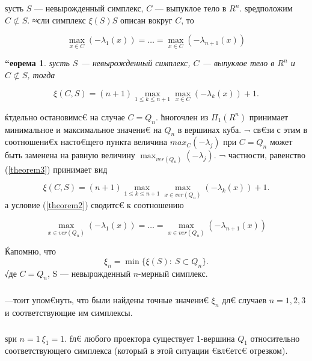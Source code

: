 \documentclass[12pt]{article} %
\begin{document}
	\newtheorem{Th2}{—ледствие}
	\begin{Th}ѕусть $S$ --- невырожденный симплекс, $C$ --- выпуклое тело в $R^n$. ѕредположим $C \not \subset S$. ≈сли симплекс $\xi(S)S$ описан вокруг $C$, то
		
		\begin{equation}\label{theorem2}
		    \max_{x \in C} (-\lambda_1(x))=\dots=\max_{x \in C} (-\lambda_{n+1}(x))
		\end{equation}
	\end{Th}
	
	\newtheorem{Th3}[Th]{“еорема}
	\begin{Th3}ѕусть $S$ --- невырожденный симплекс, $C$ --- выпуклое тело в $R^n$ и $C \not \subset S$, тогда 
		
		\begin{equation}\label{theorem3}
		\xi(C, S) = (n+1) \max_{1\leqslant k \leqslant n+1} \max_{x \in C} (-\lambda_k(x)) + 1.
		\end{equation}
	\end{Th3}
	
	ќтдельно остановимс€ на случае $C = Q_n$. ћногочлен из $\Pi_1(R^n)$ принимает минимальное и максимальное значени€ на $Q_n$ в вершинах куба. ¬ св€зи с этим в соотношени€х насто€щего пункта величина $max_C(-\lambda_j)$ при $C=Q_n$ может быть заменена на равную величину $\max_{ver(Q_n)}(-\lambda_j)$. ¬ частности, равенство (\ref{theorem3}) принимает вид
	
    \begin{equation}\label{ksiVer}
		\xi(C, S) = (n+1) \max_{1\leqslant k \leqslant n+1} \max_{x \in ver(Q_n)} (-\lambda_k(x)) + 1.
	\end{equation}
	а условие (\ref{theorem2}) сводитс€ к соотношению
	
	\begin{equation}\label{f10}
	    \max_{x \in ver(Q_n)} (-\lambda_1(x))=\dots=\max_{x \in ver(Q_n)} (-\lambda_{n+1}(x))
	\end{equation}

    Ќапомню, что
    $$\xi_n = \min \{\xi(S):\ S \subset Q_n\}.$$
	√де $C=Q_n$, S --- невырожденный $n$-мерный симплекс. 
	
	\subparagraph{}—тоит упом€нуть, что были найдены точные значени€ $\xi_n$ дл€ случаев $n = 1, 2, 3$ и соответствующие им симплексы.
	
	\subparagraph{}ѕри $n = 1\ \xi_1 = 1$. ƒл€ любого проектора существует 1-вершина $Q_1$ относительно соответствующего симплекса (который в этой ситуации €вл€етс€ отрезком).
	
\end{document}
